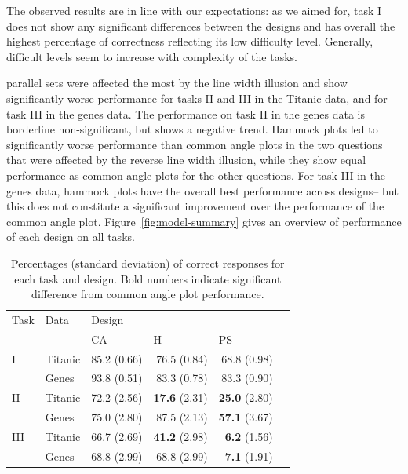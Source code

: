 The observed results are in line with our expectations:
as we aimed for, task I does not show any significant differences between the designs and has overall the highest percentage of correctness reflecting its low difficulty level. Generally, difficult levels seem to increase with complexity of the tasks.

parallel sets were affected the most by the line width illusion and show significantly worse performance for tasks II and III in the Titanic data, and for task III in the genes data. The performance on task II in the genes data is borderline non-significant, but shows a negative trend.
Hammock plots led to significantly worse performance than common angle plots in the two questions that were affected by the reverse line width illusion, while they show equal performance as common angle plots for the other questions. For task III in the genes data,  hammock plots have the overall best performance  across designs-- but this  does not  constitute a significant improvement over the performance of the common angle plot. Figure~\ref{fig:model-summary} gives an overview of  performance of each design on all tasks. 



%
\begin{table}[ht]
\begin{center}
\begin{tabular}{llrrrr}
  \hline
Task & Data & \multicolumn{3}{l}{Design} \\
& & \multicolumn{1}{l}{CA} & \multicolumn{1}{l}{H}  & \multicolumn{1}{l}{PS}  \\ 
  \hline
 I & Titanic & 85.2 (0.66) & 76.5 (0.84) & 68.8 (0.98) \\ 
& Genes & 93.8 (0.51) & 83.3 (0.78) & 83.3 (0.90) \\ [3pt]
 II& Titanic & 72.2 (2.56) & {\bf 17.6} (2.31) & {\bf 25.0} (2.80) \\ 
& Genes & 75.0 (2.80) & 87.5 (2.13) & {\bf 57.1} (3.67) \\ [3pt]
III & Titanic & 66.7 (2.69) & {\bf 41.2} (2.98) & {\bf 6.2} (1.56) \\ 
& Genes & 68.8 (2.99) & 68.8 (2.99) & {\bf 7.1} (1.91) \\ \hline
\end{tabular}
\end{center}
\caption{\label{raw} Percentages (standard deviation) of correct responses for each task and design. Bold numbers indicate significant difference from common angle plot performance.  }
\end{table}

